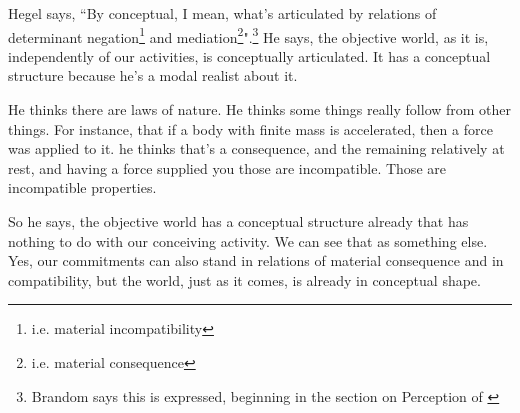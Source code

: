 Hegel says, ``By conceptual, I mean, what's articulated by relations of determinant negation\footnote{i.e. material incompatibility} and mediation\footnote{i.e. material consequence}".\footnote{Brandom says this is expressed, beginning in the section on Perception of \cite{hegel2007phenomenology}} He says, the objective world, as it is, independently of our activities, is conceptually articulated. It has a conceptual structure because he's a modal realist about it.

He thinks there are laws of nature. He thinks some things really follow from other things. For instance, that if a body with finite mass is accelerated, then a force was applied to it. he thinks that's a consequence, and the remaining relatively at rest, and having a force supplied you those are incompatible. Those are incompatible properties.

So he says, the objective world has a conceptual structure already that has nothing to do with our conceiving activity. We can see that as something else. Yes, our commitments can also stand in relations of material consequence and in compatibility, but the world, just as it comes, is already in conceptual shape.